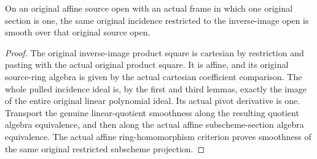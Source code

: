 \begin{lemma}
\label{lem:kn-nadel-bertini-restricted-incidence-smooth}
\leanok
{}
On an original affine source open with an actual frame in which one
original section is one, the same original incidence restricted to the
inverse-image open is smooth over that original source open.
\end{lemma}
\begin{proof}
The original inverse-image product square is cartesian by restriction and
pasting with the actual original product square. It is affine, and its
original source-ring algebra is given by the actual cartesian coefficient
comparison. The whole pulled incidence ideal is, by the first and third
lemmas, exactly the image of the entire original linear polynomial ideal.
Its actual pivot derivative is one. Transport the genuine linear-quotient
smoothness along the resulting quotient algebra equivalence, and then
along the actual affine subscheme-section algebra equivalence. The actual
affine ring-homomorphism criterion proves smoothness of the same original
restricted subscheme projection.
\end{proof}

